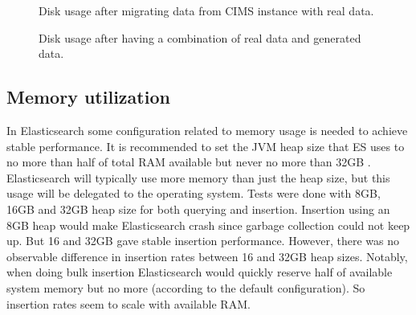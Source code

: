 \begin{figure}[h!]
\centering
{}
\caption{Disk usage after migrating data from CIMS instance with real data.}
\label{fig:disc}
\end{figure}

\begin{figure}[h!]
\centering
{}
\caption{Disk usage after having a combination of real data and generated data.}
\label{fig:discbig}
\end{figure}

\subsection{Memory utilization}

In Elasticsearch some configuration related to memory usage is needed to achieve stable performance. It is recommended to set the JVM heap size that ES uses to no more than half of total RAM available but never no more than 32GB \cite{JVM, ESmemory}. Elasticsearch will typically use more memory than just the heap size, but this usage will be delegated to the operating system. Tests were done with 8GB, 16GB and 32GB heap size for both querying and insertion. Insertion using an 8GB heap would make Elasticsearch crash since garbage collection could not keep up. But 16 and 32GB gave stable insertion performance. However, there was no observable difference in insertion rates between 16 and 32GB heap sizes. Notably, when doing bulk insertion Elasticsearch would quickly reserve half of available system memory but no more (according to the default configuration). So insertion rates seem to scale with available RAM.

